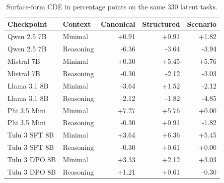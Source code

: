 \begin{table}[t]
\centering\scriptsize
\caption{Surface-form CDE in percentage points on the same 330 latent tasks.}
\label{tab:surface-cde}
\begin{tabular}{@{}llrrr@{}}
\toprule
Checkpoint & Context & Canonical & Structured & Scenario \\
\midrule
Qwen 2.5 7B & Minimal & +0.91 & +0.91 & +1.82 \\
Qwen 2.5 7B & Reasoning & -6.36 & -3.64 & -3.94 \\
\addlinespace[1.5pt]
Mistral 7B & Minimal & +0.30 & +5.45 & +5.76 \\
Mistral 7B & Reasoning & -0.30 & -2.12 & -3.03 \\
\addlinespace[1.5pt]
Llama 3.1 8B & Minimal & -3.64 & +1.52 & -2.12 \\
Llama 3.1 8B & Reasoning & -2.12 & -1.82 & -4.85 \\
\addlinespace[1.5pt]
Phi 3.5 Mini & Minimal & +7.27 & +5.76 & +0.00 \\
Phi 3.5 Mini & Reasoning & -0.30 & +0.91 & -1.82 \\
\addlinespace[1.5pt]
Tulu 3 SFT 8B & Minimal & +3.64 & +6.36 & +5.45 \\
Tulu 3 SFT 8B & Reasoning & -0.30 & +0.61 & +0.00 \\
\addlinespace[1.5pt]
Tulu 3 DPO 8B & Minimal & +3.33 & +2.12 & +3.03 \\
Tulu 3 DPO 8B & Reasoning & +1.21 & +0.61 & -0.30 \\
\bottomrule
\end{tabular}
\end{table}
